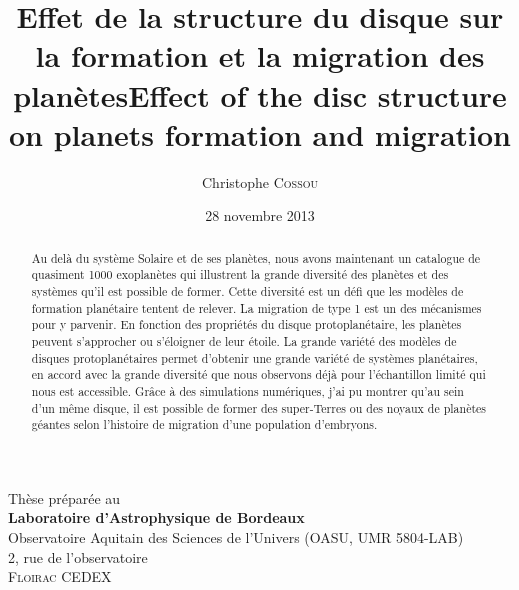 \documentclass[logos,chaptertoc]{bordeaux-thesis}
\author{Christophe \textsc{Cossou}}
\title{Effet de la structure du disque sur la formation et la migration des planètes}
\title[english]{Effect of the disc structure on planets formation and migration}
\date{28 novembre 2013}
\begin{document}
\maketitle%

\pagestyle{empty}

\cleardoublepage
\null
\vfill
\noindent
{}\hfill
  \begin{minipage}[b]{.75\textwidth}
  \noindent Th\`{e}se pr\'{e}par\'{e}e au\\{\footnotesize
    \textbf{Laboratoire d'Astrophysique de Bordeaux}\\
    Observatoire Aquitain des Sciences de l'Univers (OASU, UMR 5804-LAB)\\
    2, rue de l'observatoire\\
     \textsc{Floirac CEDEX}}
  \end{minipage}
\hfill
\cleardoublepage



\begin{abstract}
Au delà du système Solaire et de ses planètes, nous avons maintenant un catalogue de quasiment 1000 exoplanètes qui illustrent la grande diversité des planètes et des systèmes qu'il est possible de former. Cette diversité est un défi que les modèles de formation planétaire tentent de relever. La migration de type 1 est un des mécanismes pour y parvenir. En fonction des propriétés du disque protoplanétaire, les planètes peuvent s'approcher ou s'éloigner de leur étoile. La grande variété des modèles de disques protoplanétaires permet d'obtenir une grande variété de systèmes planétaires, en accord avec la grande diversité que nous observons déjà pour l'échantillon limité qui nous est accessible. Grâce à des simulations numériques, j'ai pu montrer qu'au sein d'un même disque, il est possible de former des super-Terres ou des noyaux de planètes géantes selon l'histoire de migration d'une population d'embryons.
\end{abstract}

\noindent\hspace*{0.35\textwidth}\hrulefill\hspace*{0.35\textwidth}\\[-\bigskipamount]
\end{document}

